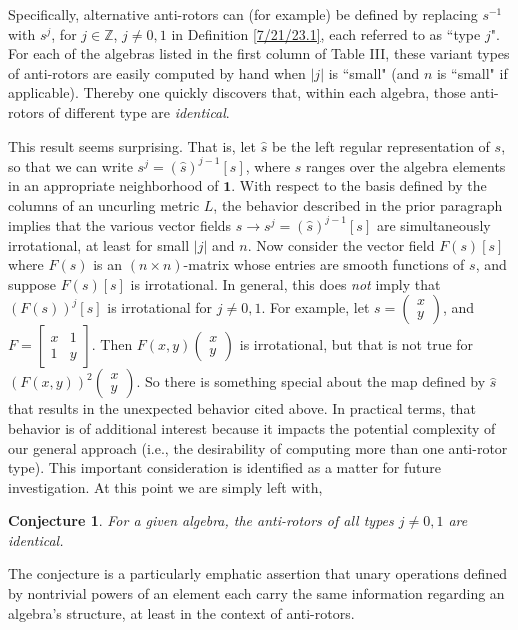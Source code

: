 \documentclass{amsart}
\numberwithin{equation}{section}
\newtheorem*{conjecture}{Conjecture}
\theoremstyle{definition}
\numberwithin{theorem}{section}
\begin{document}
  Specifically, alternative anti-rotors can (for example) be defined by replacing $s^{-1}$ with $s^j$, for $j\in\mathbb{Z}$, $j\ne 0,1$ in Definition \ref{7/21/23.1}, each referred to as ``type $j$".  For each of the algebras listed in the first column of Table III, these variant types of anti-rotors are easily computed by hand when  $|j|$ is ``small" (and $n$ is ``small" if applicable).  
Thereby one quickly discovers that, within each algebra, those anti-rotors of different type are {\it identical}.  

This result seems surprising.  That is, let $\hat{s}$ be the left regular representation of $s$, so that we can write $s^j = (\hat{s})^{j-1}[s]$, where $s$ ranges over the algebra elements in an appropriate neighborhood of $\mathbf{1}$. With respect to the basis defined by the columns of an uncurling metric $L$, the behavior described in the prior paragraph implies that the various vector fields $s\rightarrow s^j = (\hat{s})^{j-1}[s]$ are simultaneously irrotational, at least for small $|j|$ and $n$.  Now consider the vector field $F(s)[s]$ where $F(s)$ is an $(n\times n)$-matrix whose entries are smooth functions of $s$, and suppose $F(s)[s]$ is \mbox{irrotational}.  In general, this does {\it not} imply that $(F(s))^j[s]$ is irrotational for $j\ne 0,1$. For example, let $s=\left(\begin{array}{ccc}
 x   \\ 
y    
\end{array}\right)$, and $F= \left[\begin{array}{ccc}
x & 1   \\ 
 1 & y    
\end{array}\right]$.  Then $F(x,y)\left(\begin{array}{ccc}
 x   \\ 
y    
\end{array}\right)$ is irrotational, but that is not true for $(F(x,y))^2\left(\begin{array}{ccc}
 x   \\ 
y    
\end{array}\right)$.  So there is something special about the map defined by $\hat{s}$ that results in the unexpected behavior cited above. 
In practical terms, that behavior is of additional interest because it impacts the potential complexity of our general approach (i.e., the desirability of computing more than one anti-rotor type).  This important consideration is identified as a matter for future investigation. At this point we are simply left with,
\begin{conjecture} For a given algebra, the anti-rotors of all types $j\ne 0,1$ are identical. 
\end{conjecture}
\noindent The conjecture is a particularly emphatic assertion that unary operations defined by nontrivial powers of an element each carry the same information regarding an algebra's structure, at least in the context of anti-rotors. 
\end{document}
